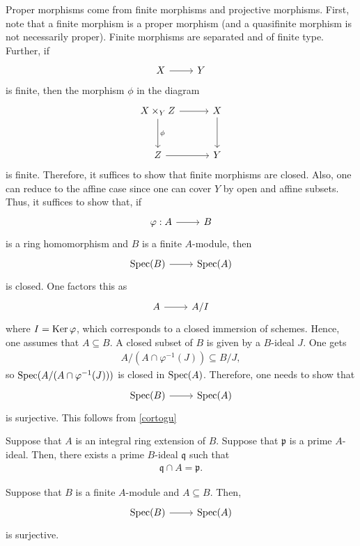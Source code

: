 \documentclass [11 pt, oneside] {article}
\begin{document}
Proper morphisms come from finite morphisms and projective morphisms. First, note that a finite morphism is a proper morphism (and a quasifinite morphism is not necessarily proper). Finite morphisms are separated and of finite type. Further, if 
\[
\begin{tikzcd}
X\ar[r]&Y
\end{tikzcd}
\] 
is finite, then the morphism $\phi$ in the diagram
\[
\begin{tikzcd}[row sep = 3 em, column sep = 3 em]
	X\times_Y Z \ar[r]\ar[d,"\phi"] &X\ar[d]\\ Z\ar[r]&Y
\end{tikzcd}
\]
is finite. Therefore, it suffices to show that finite morphisms are closed. Also, one can reduce to the affine case since one can cover $Y$ by open and affine subsets. Thus, it suffices to show that, if 
\[
\begin{tikzcd}
\varphi:A\ar[r]& B
\end{tikzcd}
\]  
is a ring homomorphism and $B$ is a finite $A$-module, then 
\[
\begin{tikzcd}
\Spec(B)\ar[r]& \Spec(A)
\end{tikzcd}
\] 
is closed. One factors this as 
\[
\begin{tikzcd}
A\ar[r]& A/I
\end{tikzcd}
\] 
where $I=\operatorname{Ker} \varphi$, which corresponds to a closed immersion of schemes. Hence, one assumes that $A\subseteq B$. A closed subset of $B$ is given by a $B$-ideal $J$. One gets
\begin{align*}
	A/(A\cap \varphi^{-1}(J)) \subseteq B/J,
\end{align*}
so $\operatorname{Spec} (A/(A\cap \varphi^{-1}(J)))$ is closed in $\operatorname{Spec} (A)$. Therefore, one needs to show that 
\[
\begin{tikzcd}
\Spec(B)\ar[r]&\Spec(A)
\end{tikzcd}
\] 
is surjective. This follows from \cref{cortogu}

\begin{theorem}\label{goingup}\text{}
Suppose that $A$ is an integral ring extension of $B$. Suppose that $\mathfrak{p}$ is a prime $A$-ideal. Then, there exists a prime $B$-ideal $\mathfrak{q}$ such that 
\begin{align*}
	\mathfrak{q}\cap A = \mathfrak{p}.
\end{align*}
\end{theorem}

\begin{corollary}\label{cortogu}
	Suppose that $B$ is a finite $A$-module and $A\subseteq B$. Then, 
	\[
\begin{tikzcd}
\Spec(B)\ar[r]& \Spec(A)
\end{tikzcd}
\] 
 is surjective. 
\end{corollary}
\end{document}
